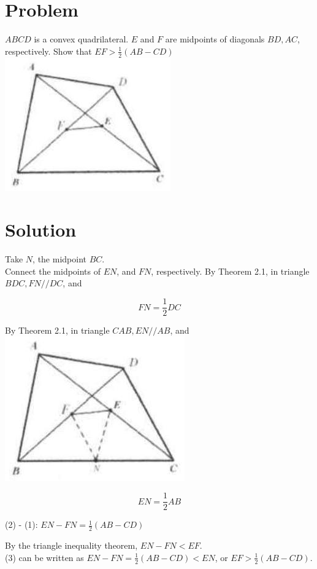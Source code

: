\documentclass{article}
\begin{document}
\section*{Problem}
\(A B C D\) is a convex quadrilateral. \(E\) and \(F\) are midpoints of diagonals \(B D, A C\), respectively. Show that \(E F>\frac{1}{2}(A B-C D)\)\\
\centering
\includegraphics[width=\textwidth]{images/044(1).jpg}

\section*{Solution}
Take \(N\), the midpoint \(B C\).\\
Connect the midpoints of \(E N\), and \(F N\), respectively. By Theorem 2.1, in triangle \(B D C, F N / / D C\), and

\[
F N=\frac{1}{2} D C
\]

By Theorem 2.1, in triangle \(C A B, E N / / A B\), and\\
\centering
\includegraphics[width=\textwidth]{images/048.jpg}

\[
E N=\frac{1}{2} A B
\]

(2) - (1): \(E N-F N=\frac{1}{2}(A B-C D)\)

By the triangle inequality theorem, \(E N-F N<E F\).\\
(3) can be written as \(E N-F N=\frac{1}{2}(A B-C D)<E N\), or \(E F>\frac{1}{2}(A B-C D)\).
\end{document}

